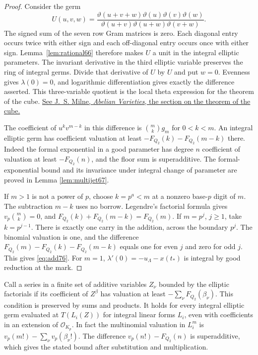 \documentclass[a4paper,11pt]{article}
\theoremstyle{definition}
\theoremstyle{remark}
\numberwithin{equation}{section}
\begin{document}
\begin{proof}
Consider the germ
\[
 U(u,v,w)=
 \frac{\vartheta(u+v+w)\vartheta(u)\vartheta(v)\vartheta(w)}
      {\vartheta(u+v)\vartheta(u+w)\vartheta(v+w)} .
\]
The signed sum of the seven row Gram matrices is zero. Each
diagonal entry occurs twice with either sign and each off-diagonal
entry occurs once with either sign. Lemma~\ref{lem:rational66}
therefore makes \(U\) a unit in the integral elliptic parameters.
The invariant derivative in the third elliptic variable preserves
the ring of integral germs. Divide that derivative of \(U\) by
\(U\) and put \(w=0\). Evenness gives \(\lambda(0)=0\), and
logarithmic differentiation gives exactly the difference asserted.
This three-variable quotient is the local theta expression for
the theorem of the cube. \href{https://www.jmilne.org/math/CourseNotes/AVc.pdf}
{See J.~S. Milne, \emph{Abelian Varieties}, the section on the theorem of the cube.}

The coefficient of \(u^k v^{m-k}\) in this difference is
\(\binom{m}{k}g_m\) for \(0<k<m\). An integral elliptic germ has
coefficient valuation at least \(-F_{Q_2}(k)-F_{Q_2}(m-k)\) there.
Indeed the formal exponential in a good parameter has degree \(n\)
coefficient of valuation at least \(-F_{Q_2}(n)\), and the floor
sum is superadditive. The formal-exponential bound and its
invariance under integral change of parameter are proved in
Lemma \ref{lem:multijet67}.

If \(m>1\) is not a power of \(p\), choose \(k=p^a<m\) at a
nonzero base-\(p\) digit of \(m\). The subtraction \(m-k\) uses
no borrow. Legendre's factorial formula gives
\(v_p\binom{m}{k}=0\), and
\(F_{Q_2}(k)+F_{Q_2}(m-k)=F_{Q_2}(m)\). If \(m=p^j\), \(j\ge1\),
take \(k=p^{j-1}\). There is exactly one carry in the addition,
across the boundary \(p^j\). The binomial valuation is one,
and the difference
\(F_{Q_2}(m)-F_{Q_2}(k)-F_{Q_2}(m-k)\) equals one for even
\(j\) and zero for odd \(j\). This gives \eqref{eq:add76}.
For \(m=1\), \(\lambda'(0)=-u_\Lambda-x(t_*)\) is integral
by good reduction at the mark.
\end{proof}

Call a series in a finite set of additive variables \(Z_\nu\)
bounded by the elliptic factorials if its coefficient of \(Z^\beta\)
has valuation at least \(-\sum_\nu F_{Q_2}(\beta_\nu)\).
This condition is preserved by sums and products. It holds for
every integral elliptic germ evaluated at \(T(L_i(Z))\) for
integral linear forms \(L_i\), even with coefficients in an
extension of \(\mathcal O_{K_p}\). In fact the multinomial
valuation in \(L_i^m\) is \(v_p(m!)-\sum_\nu v_p(\beta_\nu!)\).
The difference \(v_p(n!)-F_{Q_2}(n)\) is superadditive, which
gives the stated bound after substitution and multiplication.
\end{document}
